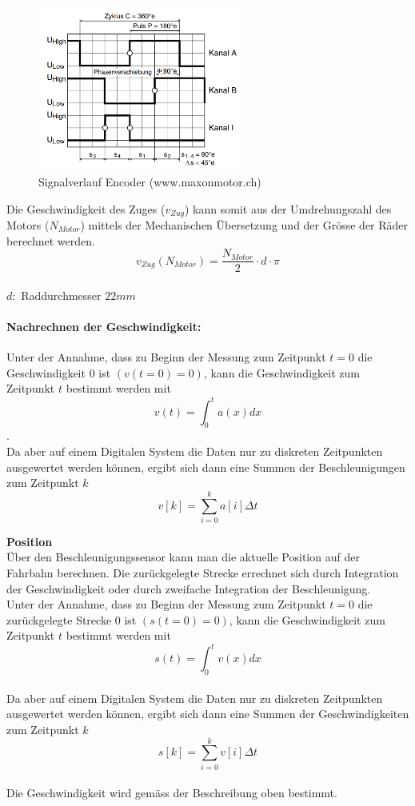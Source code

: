 \documentclass[../../main.tex]{subfiles}
\begin{document}
    \begin{figure}[H]
        \centering
        \includegraphics[width=0.6\textwidth]{Encoder_MR.png}
        \caption {Signalverlauf Encoder (www.maxonmotor.ch)}
        \label{fig:et_encoder}
    \end{figure}

    Die Geschwindigkeit des Zuges ($v_{Zug}$) kann somit aus der Umdrehungszahl des Motors ($N_{Motor}$) mittels der Mechanischen Übersetzung und der Grösse der Räder berechnet werden.
    $$v_{Zug}(N_{Motor}) = \frac{N_{Motor}}{2} \cdot d \cdot \pi$$\\
    $d:$ Raddurchmesser $22mm$\\

    \paragraph{Nachrechnen der Geschwindigkeit:}
    Unter der Annahme, dass zu Beginn der Messung zum Zeitpunkt $t = 0$ die Geschwindigkeit $0$ ist $(v(t=0) = 0)$, kann die Geschwindigkeit zum Zeitpunkt $t$ bestimmt werden mit $$v(t) = \int_{0}^{t} a(x) dx$$.\\
    Da aber auf einem Digitalen System die Daten nur zu diskreten Zeitpunkten ausgewertet werden können, ergibt sich dann eine Summen der Beschleunigungen zum Zeitpunkt $k$ $$v[k] = \sum_{i=0}^{k}a[i] \Delta t$$

    \textbf{Position}\\
    Über den Beschleunigungssensor kann man die aktuelle Position auf der Fahrbahn berechnen. Die zurückgelegte Strecke errechnet sich durch Integration der Geschwindigkeit oder durch zweifache Integration der Beschleunigung.\\
    Unter der Annahme, dass zu Beginn der Messung zum Zeitpunkt $t = 0$ die zurückgelegte Strecke $0$ ist $(s(t=0) = 0)$, kann die Geschwindigkeit zum Zeitpunkt $t$ bestimmt werden mit $$s(t) = \int_{0}^{t} v(x) dx$$\\
    Da aber auf einem Digitalen System die Daten nur zu diskreten Zeitpunkten ausgewertet werden können, ergibt sich dann eine Summen der Geschwindigkeiten zum Zeitpunkt $k$ $$s[k] = \sum_{i=0}^{k}v[i] \Delta t$$\\
    Die Geschwindigkeit wird gemäss der Beschreibung oben bestimmt.
\end{document}
